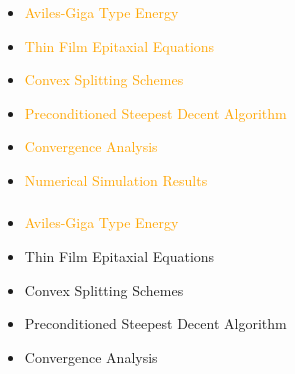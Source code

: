 \documentclass[amstex]{beamer}
\newcommand{\wuhao}{\fontsize{10.5pt}{\baselineskip}\selectfont}    %
\begin{document}
\begin{CJK*}{GBK}{kai}
    \date{March 13, 2016}
    \frame{\titlepage}
 \begin{frame}
      \frametitle{\wuhao{\bf  Outline}}
        \begin{itemize}%
          \item \textcolor{orange}{Aviles-Giga Type Energy}
           \item \textcolor{orange}{Thin Film Epitaxial Equations}
          \item \textcolor{orange}{Convex Splitting Schemes}
 		  \item \textcolor{orange}{Preconditioned Steepest Decent Algorithm}
 	      \item \textcolor{orange}{Convergence Analysis}
          \item \textcolor{orange}{Numerical Simulation Results}
        \end{itemize}
\end{frame}
 \begin{frame}
 	\frametitle{\wuhao{\bf  Outline}}
 	\begin{itemize}%
 		\item \textcolor{orange}{Aviles-Giga Type Energy}
 		\item \textcolor{orange!10}{Thin Film Epitaxial Equations}
 		\item \textcolor{orange!10}{Convex Splitting Schemes}
 		\item \textcolor{orange!10}{Preconditioned Steepest Decent Algorithm}
 		\item \textcolor{orange!10}{Convergence Analysis}

\end{itemize}
\end{frame}
\end{CJK*}
\end{document}

